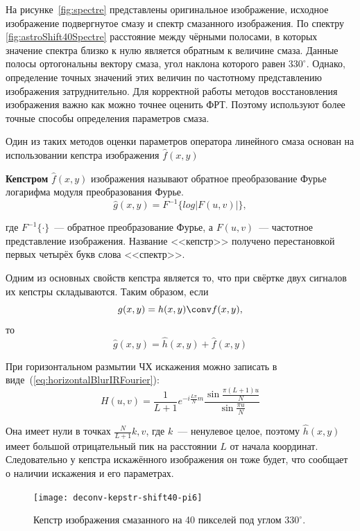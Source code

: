 На рисунке~\ref{fig:spectre} представлены оригинальное изображение, исходное изображение подвергнутое смазу и спектр смазанного изображения. По спектру \ref{fig:astroShift40Spectre} расстояние между чёрными полосами, в которых значение спектра близко к нулю является обратным к величине смаза. Данные полосы ортогональны вектору смаза, угол наклона которого равен $330^\circ$. Однако, определение точных значений этих величин по частотному представлению изображения затруднительно. Для корректной работы методов восстановления изображения важно как можно точнее оценить ФРТ. Поэтому используют более точные способы определения параметров смаза.

Один из таких методов оценки параметров оператора линейного смаза основан на использовании кепстра изображения $\hat{f}(x,y)$~\cite{iterableImageRestorationBiemonLangdeik}
\begin{definition}\label{def:kepstr}
	\textbf{Кепстром} $\hat{f}(x,y)$ изображения называют обратное преобразование Фурье логарифма модуля преобразования Фурье.
	\begin{equation}
	\hat{g}(x,y) = F^{-1}\{log|F(u,v)|\},
	\end{equation}
\end{definition}
где $F^{-1}\{\cdot\}$~--- обратное преобразование Фурье, а $F(u,v)$~--- частотное представление изображения. Название <<кепстр>> получено перестановкой первых четырёх букв слова <<спектр>>.

Одним из основных свойств кепстра является то, что при свёртке двух сигналов их кепстры складываются. Таким образом, если
\begin{equation}
	g(x,y) = h(x,y) \conv f(x,y),
\end{equation}
то \cite{iterableImageRestorationBiemonLangdeik}
\begin{equation}\label{eq:kepstrSum}
	\hat{g}(x,y) = \hat{h}(x,y) + \hat{f}(x,y)
\end{equation}

При горизонтальном размытии ЧХ искажения можно записать в виде~(\ref{eq:horizontalBlurIRFourier}):
\begin{equation*}
H(u,v) =       
\frac{1}{L+1}e^{-i\frac{L\pi}{N}m}\frac{\sin\frac{\pi(L+1)u}{N}}{\sin\frac{\pi u}{N}}
\end{equation*}

Она имеет нули в точках $\frac{N}{L+1}k, v$, где $k$~--- ненулевое целое, поэтому $\hat{h}(x,y)$ имеет большой отрицательный пик на расстоянии $L$ от начала координат. Следовательно у кепстра искажённого изображения он тоже будет, что сообщает о наличии искажения и его параметрах.
\begin{figure}[h!]
	\centerline{\texttt{[image: deconv-kepstr-shift40-pi6]}}
	\caption{Кепстр изображения смазанного на 40 пикселей под углом $330^{\circ}$.}
	\label{fig:kepstr}
\end{figure}

